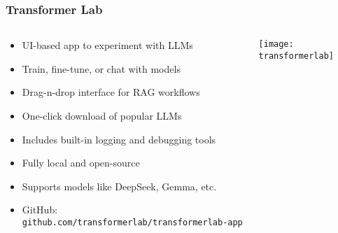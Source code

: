 \begin{frame}[fragile]\frametitle{Transformer Lab}
\begin{columns}
    \begin{column}[T]{0.6\linewidth}
      \begin{itemize}
        \item UI-based app to experiment with LLMs
        \item Train, fine-tune, or chat with models
        \item Drag-n-drop interface for RAG workflows
        \item One-click download of popular LLMs
        \item Includes built-in logging and debugging tools
        \item Fully local and open-source
        \item Supports models like DeepSeek, Gemma, etc.
        \item GitHub: \texttt{github.com/transformerlab/transformerlab-app}
      \end{itemize}
    \end{column}
    \begin{column}[T]{0.4\linewidth}
        \begin{center}
        \texttt{[image: transformerlab]}
        \end{center}	
    \end{column}
\end{columns}
\end{frame}

